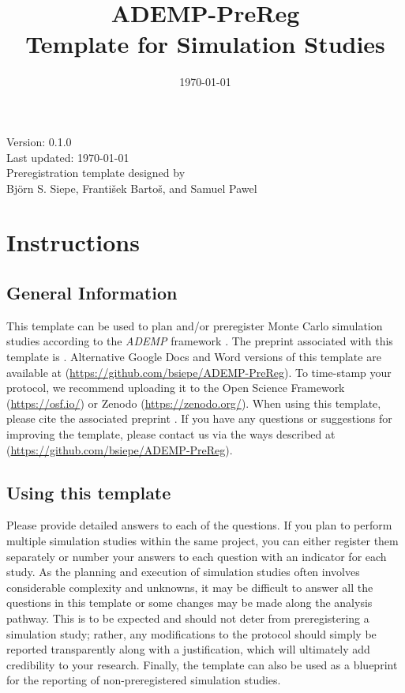\documentclass[12pt]{article}
\title{ADEMP-PreReg \\ Template for Simulation Studies}
\date{\today}
\begin{document}
\begin{titlepage}
    \maketitle
    \thispagestyle{empty}
    \vfill
    \centering
    Version: 0.1.0 \\
    Last updated: \today \\ %
    Preregistration template designed by \\
    Björn S. Siepe, František Bartoš, and Samuel Pawel \\
    \vfill
\end{titlepage}

\newpage



\section{Instructions}
\subsection*{General Information}
This template can be used to plan and/or preregister Monte Carlo simulation studies according to the \textit{ADEMP} framework \parencite{Morris2019}. The preprint associated with this template is \parencite{Siepe2023}. Alternative Google Docs and Word versions of this template are available at (\url{https://github.com/bsiepe/ADEMP-PreReg}). To time-stamp your protocol, we recommend uploading it to the Open Science Framework (\url{https://osf.io/}) or Zenodo (\url{https://zenodo.org/}). When using this template, please cite the associated preprint \parencite{Siepe2023}. If you have any questions or suggestions for improving the template, please contact us via the ways described at (\url{https://github.com/bsiepe/ADEMP-PreReg}). \\

\subsection*{Using this template}
Please provide detailed answers to each of the questions. If you plan to perform multiple simulation studies within the same project, you can either register them separately or number your answers to each question with an indicator for each study. As the planning and execution of simulation studies often involves considerable complexity and unknowns, it may be difficult to answer all the questions in this template or some changes may be made along the analysis pathway. This is to be expected and should not deter from preregistering a simulation study; rather, any modifications to the protocol should simply be reported transparently along with a justification, which will ultimately add credibility to your research. Finally, the template can also be used as a blueprint for the reporting of non-preregistered simulation studies.
\end{document}

